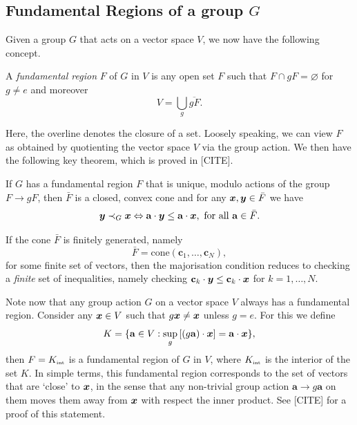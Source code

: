 \documentclass[pra,
aps,
twocolumn,
superscriptaddress,
groupedaddress,
nofootinbib,
reprint
]{revtex4-1}
\begin{document}
\subsection{Fundamental Regions of a group $G$}
Given a group $G$ that acts on a vector space $V$, we now have the following concept.
\begin{definition} A \emph{fundamental region} $F$ of $G$ in $V$ is any open set $F$ such that $F \cap gF = \varnothing$ for $g \ne e$ and moreover 
\begin{equation}
V = \bigcup_{g} \overline{g F}.
\end{equation}
\end{definition}
Here, the overline denotes the closure of a set. Loosely speaking, we can view $F$ as obtained by quotienting the vector space $V$ via the group action. We then have the following key theorem, which is proved in [CITE].
\begin{theorem} If $G$ has a fundamental region $F$ that is unique, modulo actions of the group $F\rightarrow gF$, then $\bar{F}$ is a closed, convex cone and for any $\boldsymbol{x}, \boldsymbol{y} \in \bar{F}$ we have
\begin{equation}
\boldsymbol{y} \prec_G \boldsymbol{x} \Leftrightarrow \mathbf{a}\cdot \boldsymbol{y} \le \mathbf{a} \cdot \boldsymbol{x}, \mbox{ for all } \mathbf{a} \in \bar{F}.
\end{equation}
\end{theorem}
If the cone $\bar{F}$ is finitely generated, namely 
\begin{equation}
\bar{F} = \mbox{cone}( \mathbf{c}_1, \dots, \mathbf{c}_N),
\end{equation}
for some finite set of vectors, then the majorisation condition reduces to checking a \emph{finite} set of inequalities, namely checking $\mathbf{c}_k \cdot \boldsymbol{y} \le \mathbf{c}_k \cdot \boldsymbol{x}$ for $k=1, \dots , N$.

Note now that any group action $G$ on a vector space $V$ always has a fundamental region. Consider any $\boldsymbol{x} \in V$ such that $g \boldsymbol{x} \ne \boldsymbol{x}$ unless $g =e$. For this we define
\begin{equation}
K = \{ \mathbf{a} \in V : \sup_g \left [ (g\mathbf{a})\cdot \boldsymbol{x} \right ] = \mathbf{a} \cdot \boldsymbol{x} \},
\end{equation}
then $F = K_{\mbox{\tiny int}}$ is a fundamental region of $G$ in $V$, where $ K_{\mbox{\tiny int}}$ is the interior of the set $K$. In simple terms, this fundamental region corresponds to the set of vectors that are `close' to $\boldsymbol{x}$, in the sense that any non-trivial group action $\mathbf{a} \rightarrow g \mathbf{a}$ on them moves them away from $\boldsymbol{x}$ with respect the inner product. See [CITE] for a proof of this statement.
\end{document}
